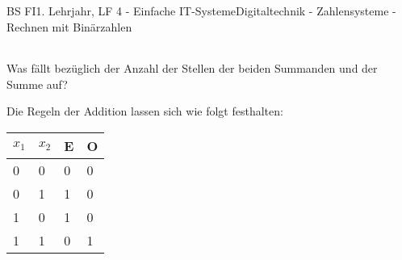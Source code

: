 \documentclass[11pt,twocolumn,oneside,openany,headings=optiontotoc,11pt,numbers=noenddot]{article}
\begin{document}
\begin{worksheet}{BS FI}{1. Lehrjahr, LF 4 - Einfache IT-Systeme}{Digitaltechnik - Zahlensysteme - Rechnen mit Binärzahlen}
\begin{framed}
\begin{tabularx}{0.4\textwidth}{llllll}
				\cline{2-6}
			\end{tabularx}
		\end{framed}
		\noindent
		Was fällt bezüglich der Anzahl der Stellen der beiden Summanden und der Summe auf?\\
		\par\noindent
		Die Regeln der Addition lassen sich wie folgt festhalten:\\
		\par\noindent
		\begin{tabularx}{0.48\textwidth}{MM|MM}
			\(x_1\) & \(x_2\) & E & O\\
			 & 0 & 0 & 0\\
			0 & 1 & 1 & 0\\
			1 & 0 & 1 & 0\\
			1 & 1 & 0 & 1\\
		\end{tabularx}
	\end{worksheet}
\end{document}
